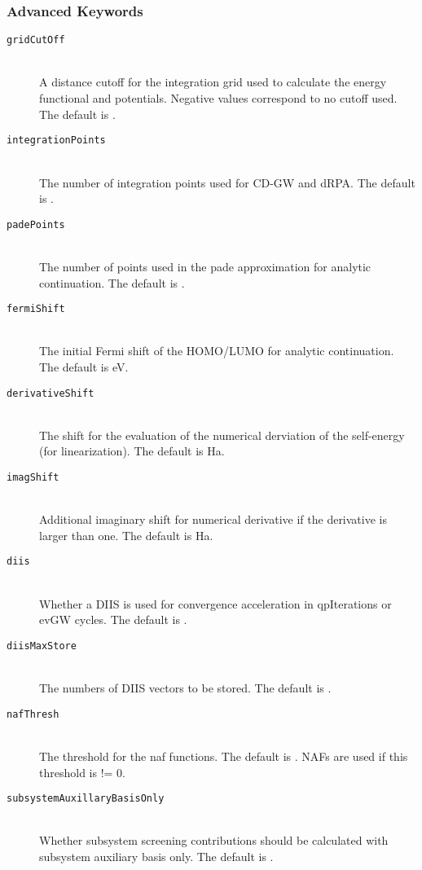 \subsubsection{Advanced Keywords}
\begin{description}
  \item [\texttt{gridCutOff}]\hfill \\
  A distance cutoff for the integration grid used to calculate the energy functional and potentials. Negative values correspond to no cutoff used. The default is .
  \item [\texttt{integrationPoints}]\hfill \\
  The number of integration points used for CD-GW and dRPA. The default is .
  \item [\texttt{padePoints}]\hfill \\
  The number of points used in the pade approximation for analytic continuation. The default is .
  \item [\texttt{fermiShift}]\hfill \\
  The initial Fermi shift of the HOMO/LUMO for analytic continuation. The default is  eV.  
  \item [\texttt{derivativeShift}]\hfill \\
  The shift for the evaluation of the numerical derviation of the self-energy (for linearization). The default is  Ha.
  \item [\texttt{imagShift}]\hfill \\
  Additional imaginary shift for numerical derivative if the derivative is larger than one. The default is  Ha.
  \item [\texttt{diis}]\hfill \\
  Whether a DIIS is used for convergence acceleration in qpIterations or evGW cycles. The default is .
  \item [\texttt{diisMaxStore}]\hfill \\
  The numbers of DIIS vectors to be stored. The default is .
  \item [\texttt{nafThresh}]\hfill \\
  The threshold for the naf functions. The default is . NAFs are used if this threshold is != 0.
  \item [\texttt{subsystemAuxillaryBasisOnly}]\hfill \\
  Whether subsystem screening contributions should be calculated with subsystem auxiliary basis only. The default is .

\end{description}

